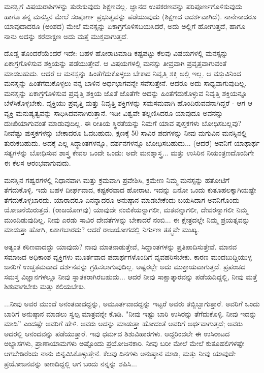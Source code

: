 ಮನಸ್ಸಿಗೆ ವಿಷಯರಾಶಿಗಳನ್ನು ತುರುಕುವುದು ಶಿಕ್ಷಣವಲ್ಲ. ಜ್ಞಾನದ ಉಪಕರಣವನ್ನು ಪರಿಪೂರ್ಣಗೊಳಿಸುವುದು ಹಾಗೂ ತನ್ನ ಮನಸ್ಸಿನ ಮೇಲೆ ಸಂಪೂರ್ಣ ಪ್ರಭುತ್ವವನ್ನು ಪಡೆಯುವುದು (ಶಿಕ್ಷಣದ ಆದರ್ಶವಾಗಿದೆ). ನಾನೇನಾದರೂ ಯಾವುದಾದರೂ (ಅಂಶದ) ಮೇಲೆ ಮನಸ್ಸನ್ನು ಏಕಾಗ್ರಗೊಳಿಸಬಯಸಿದರೆ, ಅದು ಅಲ್ಲಿಗೆ ಹೋಗುತ್ತದೆ, ಹಾಗೂ ನಾನು ಅದನ್ನು ಕರೆದಾಕ್ಷಣ ಅದು ಮತ್ತೆ ಮುಕ್ತವಾಗುತ್ತದೆ.

ದೊಡ್ಡ ತೊಂದರೆಯೆಂದರೆ ಇದೇ: ಬಹಳ ಹೋರಾಟಮಾಡಿ ಕಷ್ಟಪಟ್ಟು ಕೆಲವು ವಿಷಯಗಳಲ್ಲಿ ಮನಸ್ಸನ್ನು ಏಕಾಗ್ರಗೊಳಿಸುವ ಶಕ್ತಿಯನ್ನು ಪಡೆಯುತ್ತೇವೆ. ಆ ವಿಷಯಗಳಲ್ಲಿ ಮನಸ್ಸು ತೀವ್ರವಾಗಿ ಪ್ರವೃತ್ತವಾಗುವಂತೆ ಮಾಡಬಹುದು. ಆದರೆ ಆ ಮನಸ್ಸನ್ನು ಹಿಂತೆಗೆದುಕೊಳ್ಳಲು ಬೇಕಾದ ನಿವೃತ್ತಿ ಶಕ್ತಿ ಅಲ್ಲಿ ಇಲ್ಲ. ಆ ವಸ್ತುವಿನಿಂದ ಮನಸ್ಸನ್ನು ಹಿಂತೆಗೆದುಕೊಳ್ಳಲು ನನ್ನ ಬಾಳಿನ ಅರ್ಧಭಾಗವನ್ನೇ ಸವೆಸುತ್ತೇನೆ. ಆದರೂ ಅದು ಸಾಧ್ಯವಾಗುವುದಿಲ್ಲ. ಮನಸ್ಸನ್ನು ಏಕಾಗ್ರಗೊಳಿಸುವ ಪ್ರವೃತ್ತಿ ಶಕ್ತಿಯ ಜೊತೆ ಜೊತೆಗೇ ಅದನ್ನು ಹಿಂತೆಗೆದುಕೊಳ್ಳುವ ನಿವೃತ್ತಿ ಶಕ್ತಿಯನ್ನೂ ಬೆಳೆಸಿಕೊಳ್ಳಬೇಕು. ವ್ಯಕ್ತಿಯು ಪ್ರವೃತ್ತಿ ಮತ್ತು ನಿವೃತ್ತಿ ಶಕ್ತಿಗಳನ್ನು ಸಮಸಮವಾಗಿ ಹೊಂದಿರುವವನಾಗಿದ್ದರೆ - ಆಗ ಆ ವ್ಯಕ್ತಿ ಮನುಷ್ಯತ್ವವನ್ನು ಸಾಧಿಸಿದವನಾಗಿರುತ್ತಾನೆ. ಇಡೀ ವಿಶ್ವವೇ ತಲ್ಲಣಿಸಿದರೂ ಯಾವುದೂ ಅವನನ್ನು ದುಃಖಿಯಾಗುವಂತೆ ಮಾಡುವುದಿಲ್ಲ. ಈ ರೀತಿಯ ಸ್ಥಿರತೆಯನ್ನು ನಿಮಗೆ ಯಾವ ಪುಸ್ತಕಗಳು ಬೋಧಿಸಬಲ್ಲವು? ನೀವೆಷ್ಟು ಪುಸ್ತಕಗಳನ್ನು ಬೇಕಾದರೂ ಓದಬಹುದು, ಕ್ಷಣಕ್ಕೆ 50 ಸಾವಿರ ಪದಗಳನ್ನು ನೀವು ಮಗುವಿನ ಮನಸ್ಸಿನಲ್ಲಿ ತುರುಕಬಹುದು. ಅದಕ್ಕೆ ಎಲ್ಲ ಸಿದ್ಧಾಂತಗಳನ್ನೂ, ದರ್ಶನಗಳನ್ನೂ ಬೋಧಿಸಬಹುದು... (ಆದರೆ) ಅವನಿಗೆ ಯಾಥಾರ್ಥ ಸತ್ಯಗಳನ್ನು ಬೋಧಿಸುವ ಶಾಸ್ತ್ರ ಕೇವಲ ಒಂದೇ ಒಂದು: ಅದೇ ಮನಶ್ಶಾಸ್ತ್ರ... ಮತ್ತು ಉಸಿರಿನ ನಿಯಂತ್ರಣದೊಂದಿಗೇ ಈ ಕೆಲಸ ಆರಂಭವಾಗುವುದು.

ಮನಸ್ಸಿನ ಗಹ್ವರಗಳಲ್ಲಿ ನಿಧಾನವಾಗಿ ಮತ್ತು ಕ್ರಮವಾಗಿ ಪ್ರವೇಶಿಸಿ, ಕ್ರಮೇಣ ನಿಮ್ಮ ಮನಸ್ಸನ್ನು ಹತೋಟಿಗೆ ತೆಗೆದುಕೊಳ್ಳಿ. ಇದು ಬಹಳ ದೀರ್ಘವಾದ, ಕಷ್ಟಕರವಾದ ಹೋರಾಟ. ಇದನ್ನು ಏನೋ ಒಂದು ಕುತೂಹಲಕ್ಕಾಗಿಯಷ್ಟೇ ತೆಗೆದುಕೊಳ್ಳಬಾರದು. ಯಾರಾದರೂ ಏನನ್ನಾದರೂ ಅನುಷ್ಠಾನ ಮಾಡಬೇಕೆಂದು ಬಯಸಿದಾಗ ಅವನಿಗೊಂದು ಯೋಜನೆಯಿರುತ್ತದೆ. (ರಾಜಯೋಗವು) ಯಾವುದೇ ನಂಬಿಕೆಯನ್ನಾಗಲೀ, ಮತವನ್ನಾಗಲೀ, ದೇವರನ್ನಾಗಲೀ ನಿಮ್ಮ ಮುಂದಿಡುವುದಿಲ್ಲ. ನೀವು ಎರಡು ಸಾವಿರ ದೇವತೆಗಳನ್ನು ಬೇಕಾದರೆ ನಂಬಿ... ಈ ಕ್ಷೇತ್ರದಲ್ಲೇ ನಿಮ್ಮ ಪ್ರಯತ್ನವನ್ನು ಮಾಡುತ್ತಾ ಹೋಗಿ, ಏಕಾಗಬಾರದು? ಆದರೆ ರಾಜಯೋಗದಲ್ಲಿ ನಿರ್ಗುಣ ತತ್ತ್ವವೇ ಮುಖ್ಯ.

ಅತ್ಯಂತ ಕಠಿಣವಾದದ್ದು ಯಾವುದು? ನಾವು ಮಾತನಾಡುತ್ತೇವೆ, ಸಿದ್ದಾಂತಗಳನ್ನು ಪ್ರತಿಪಾದಿಸುತ್ತೇವೆ. ಮಾನವ ಸಮಾಜದ ಅಧಿಕಾಂಶ ವ್ಯಕ್ತಿಗಳು ಮೂರ್ತವಾದ ಪದಾರ್ಥಗಳೊಂದಿಗೆ ವ್ಯವಹರಿಸಬೇಕು. ಕಾರಣ ಮಂದಬುದ್ದಿಯುಳ್ಳ ಜನರಿಗೆ ಉಚ್ಚತಮವಾದ ದರ್ಶನವನ್ನು ಗ್ರಹಿಸಲಾಗುವುದಿಲ್ಲ. ಅಷ್ಟರಲ್ಲೇ ಅದು ಮುಕ್ತಾಯವಾಗುತ್ತದೆ. ಪ್ರಪಂಚದ ಸಮಸ್ತ ವಿಜ್ಞಾನಗಳಲ್ಲೂ ನೀವು ಸ್ನಾತಕರಾಗಿರಬಹುದು... ಆದರೆ ನೀವು ಸಾಕ್ಷಾತ್ಕಾರವನ್ನು ಪಡೆಯದಿದ್ದಲ್ಲಿ, ನೀವು ಮತ್ತೆ ಶಿಶುವಾಗಬೇಕು ಮತ್ತು ಕಲಿಯಬೇಕು.

...ನೀವು ಅವರ ಮುಂದೆ ಅನಂತವಾದದ್ದನ್ನು, ಅಮೂರ್ತವಾದದ್ದನ್ನು ಇಟ್ಟರೆ ಅವರು ತಬ್ಬಿಬ್ಬಾಗುತ್ತಾರೆ. ಅವರಿಗೆ ಒಂದು ಬಾರಿಗೆ ಅನುಷ್ಠಾನ ಮಾಡಲು ಸ್ವಲ್ಪ ಮಾತ್ರವನ್ನೇ ಕೊಡಿ. "ನೀವು ಇಷ್ಟು ಬಾರಿ ಉಸಿರನ್ನು ತೆಗೆದುಕೊಳ್ಳಿ. ನೀವು ಇದನ್ನು ಮಾಡಿ'' ಎಂದಷ್ಟೇ ಅವರಿಗೆ ಹೇಳಿ. ಅವರು ಅದನ್ನು ಮಾಡುತ್ತಾ ಹೋದಂತೆ ಅವರಿಗೆ ಅರ್ಥವಾಗುತ್ತದೆ; ಅವರು ಅದರಲ್ಲಿ ಆನಂದವನ್ನು ಪಡೆಯುತ್ತಾರೆ. ಇವು ಧರ್ಮದ ಶಿಶುವಿಹಾರಗಳು. ಆದ್ದರಿಂದಲೇ ಈ ಉಸಿರಾಟದ ಅಭ್ಯಾಸಗಳು, ಪ್ರಾಣಾಯಾಮಗಳು ಅಷ್ಟೊಂದು ಪ್ರಯೋಜನಕಾರಿ. ನೀವು ಬರೀ ಮೇಲೆ ಮೇಲೆ ಕುತೂಹಲಿಗಳಷ್ಟೇ ಆಗಬೇಡಿರೆಂದು ನಾನು ಬಿನ್ನವಿಸಿಕೊಳ್ಳುತ್ತೇನೆ. ಕೆಲವು ದಿನಗಳು ಅನುಷ್ಠಾನ ಮಾಡಿ, ಮತ್ತು ನೀವು ಯಾವುದೇ ಪ್ರಯೋಜನವನ್ನು ಕಾಣದಿದ್ದಲ್ಲಿ ಆಗ ಬಂದು ನನ್ನನ್ನು ಶಪಿಸಿ...

